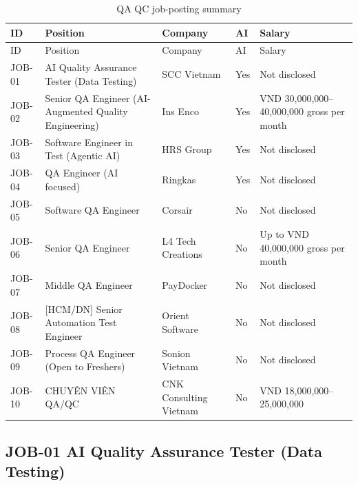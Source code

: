 \begin{longtable}{p{}p{}p{}p{}p{}}

\caption{QA QC job-posting summary}\\\toprule

ID & Position & Company & AI & Salary \\\midrule\endfirsthead

\toprule ID & Position & Company & AI & Salary \\\midrule\endhead

JOB-01 & AI Quality Assurance Tester (Data Testing) & SCC Vietnam & Yes & Not disclosed \\

JOB-02 & Senior QA Engineer (AI-Augmented Quality Engineering) & Ins Enco & Yes & VND 30,000,000–40,000,000 gross per month \\

JOB-03 & Software Engineer in Test (Agentic AI) & HRS Group & Yes & Not disclosed \\

JOB-04 & QA Engineer (AI focused) & Ringkas & Yes & Not disclosed \\

JOB-05 & Software QA Engineer & Corsair & No & Not disclosed \\

JOB-06 & Senior QA Engineer & L4 Tech Creations & No & Up to VND 40,000,000 gross per month \\

JOB-07 & Middle QA Engineer & PayDocker & No & Not disclosed \\

JOB-08 & [HCM/DN] Senior Automation Test Engineer & Orient Software & No & Not disclosed \\

JOB-09 & Process QA Engineer (Open to Freshers) & Sonion Vietnam & No & Not disclosed \\

JOB-10 & CHUYÊN VIÊN QA/QC & CNK Consulting Vietnam & No & VND 18,000,000–25,000,000 \\

\bottomrule\end{longtable}

\subsection{JOB-01 AI Quality Assurance Tester (Data Testing)}


